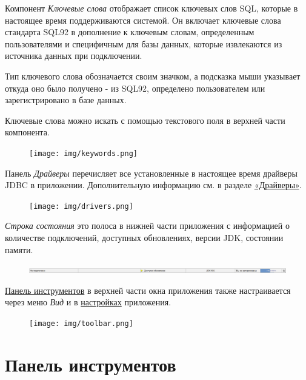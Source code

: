 
Компонент \textit{Ключевые слова} отображает список ключевых слов SQL, которые в настоящее время поддерживаются системой. Он включает ключевые слова стандарта SQL92 в дополнение к ключевым словам, определенным пользователями и специфичным для базы данных, которые извлекаются из источника данных при подключении.

Тип ключевого слова обозначается своим значком, а подсказка мыши указывает откуда оно было получено - из SQL92, определено пользователем или зарегистрировано в базе данных.

Ключевые слова можно искать с помощью текстового поля в верхней части компонента.

\begin{figure}[H]
	\centering
	\texttt{[image: img/keywords.png]}
\end{figure}


Панель \textit{Драйверы} перечисляет все установленные в настоящее время драйверы JDBC в приложении. Дополнительную информацию см. в разделе \hyperref[sec:drivers]{«Драйверы»}.

\begin{figure}[H]
	\centering
	\texttt{[image: img/drivers.png]}
\end{figure}


\textit{Строка состояния} это полоса в нижней части приложения с информацией о количестве подключений, доступных обновлениях, версии JDK, состоянии памяти.

\begin{figure}[H]
	\centering
	\includegraphics[width = 1\linewidth]{img/status_bar.png}
\end{figure}

\hyperref[sec:toolbar]{Панель инструментов} в верхней части окна приложения также настраивается через меню \textit{Вид} и в \hyperref[sec:pref_toolbar]{настройках} приложения.

\begin{figure}[H]
	\centering
	\texttt{[image: img/toolbar.png]}
\end{figure}

\newpage
\section{Панель инструментов}\label{sec:toolbar}

